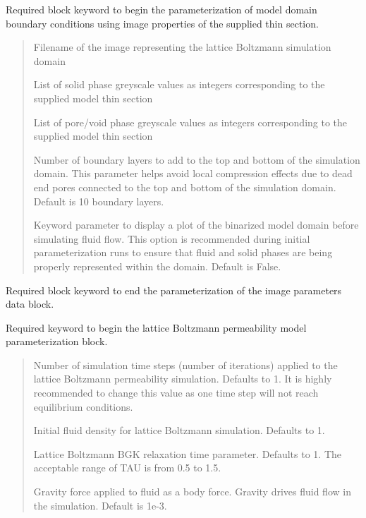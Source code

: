 \documentclass[letterpaper,10pt,english]{sphinxmanual}
\begin{document}
 Required block keyword to begin the
parameterization of model domain boundary conditions using image
properties of the supplied thin section.
\begin{quote}

 Filename of the image representing the lattice Boltzmann simulation domain

 List of solid phase greyscale values as
integers corresponding to the supplied model thin section

 List of pore/void phase greyscale values
as integers corresponding to the supplied model thin section

 Number of boundary layers to add to the
top and bottom of the simulation domain. This parameter helps avoid
local compression effects due to dead end pores connected to the top
and bottom of the simulation domain. Default is 10 boundary layers.

 Keyword parameter to display a plot of the
binarized model domain before simulating fluid flow. This option is
recommended during initial parameterization runs to ensure that
fluid and solid phases are being properly represented within the
domain. Default is False.
\end{quote}

 Required block keyword to end the
parameterization of the image parameters data block.

 Required keyword to begin
the lattice Boltzmann permeability model parameterization block.
\begin{quote}

 Number of simulation time steps (number of
iterations) applied to the lattice Boltzmann permeability
simulation. Defaults to 1. It is highly recommended to change this
value as one time step will not reach equilibrium conditions.

 Initial fluid density for lattice Boltzmann
simulation. Defaults to 1.

 Lattice Boltzmann BGK relaxation time parameter.
Defaults to 1. The acceptable range of TAU is from 0.5 to 1.5.

 Gravity force applied to fluid as a body
force. Gravity drives fluid flow in the simulation. Default is 1e-3.
\end{quote}
\end{document}
